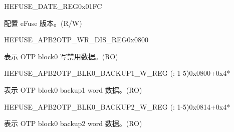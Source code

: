 \begin{register}{H}{EFUSE\_DATE\_REG}{0x01FC}\label{regdesc:EFUSEDATEREG}
%
%
\regnewline%
\begin{regdesc}\begin{reglist}
\label{fielddesc:EFUSEDATE}\item [EFUSE\_DATE] 配置 eFuse 版本。(R/W)
\end{reglist}\end{regdesc}
\end{register}


\begin{register}{H}{EFUSE\_APB2OTP\_WR\_DIS\_REG}{0x0800}\label{regdesc:EFUSEAPB2OTPWRDISREG}
%
\regnewline%
\begin{regdesc}\begin{reglist}
\label{fielddesc:EFUSEAPB2OTPBLOCK0WRDIS}\item [EFUSE\_APB2OTP\_BLOCK0\_WR\_DIS] 表示 OTP block0 写禁用数据。(RO)
\end{reglist}\end{regdesc}
\end{register}


\begin{register}{H}{EFUSE\_APB2OTP\_BLK0\_BACKUP1\_W\_REG (: 1-5)}{0x0800+0x4*}\label{regdesc:EFUSEAPB2OTPBLK0BACKUP1WNREG}
%
\regnewline%
\begin{regdesc}\begin{reglist}
\label{fielddesc:EFUSEAPB2OTPBLOCK0BACKUP1WN}\item [EFUSE\_APB2OTP\_BLOCK0\_BACKUP1\_W\regindex{n}] 表示 OTP block0 backup1 word 数据。(RO)
\end{reglist}\end{regdesc}
\end{register}


\begin{register}{H}{EFUSE\_APB2OTP\_BLK0\_BACKUP2\_W\_REG (: 1-5)}{0x0814+0x4*}\label{regdesc:EFUSEAPB2OTPBLK0BACKUP2WNREG}
%
\regnewline%
\begin{regdesc}\begin{reglist}
\label{fielddesc:EFUSEAPB2OTPBLOCK0BACKUP2WN}\item [EFUSE\_APB2OTP\_BLOCK0\_BACKUP2\_W\regindex{n}] 表示 OTP block0 backup2 word 数据。(RO)
\end{reglist}\end{regdesc}
\end{register}


